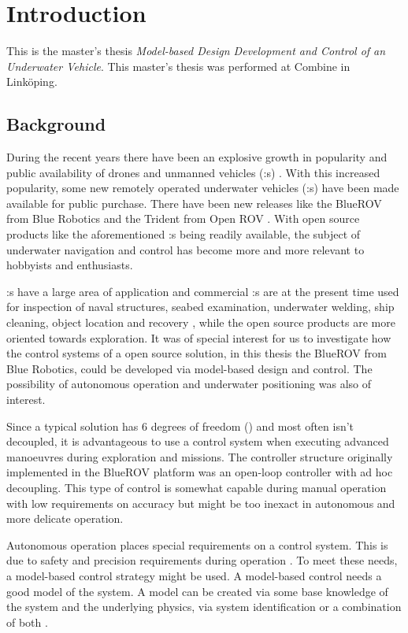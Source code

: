 \chapter{Introduction}\label{cha:intro}
This is the master's thesis \textit{Model-based Design Development and Control of an Underwater Vehicle}.
This master's thesis was performed at Combine in Linköping.

\section{Background}
During the recent years there have been an explosive growth in popularity and public availability of drones and unmanned vehicles (\abbrUV:s) \citep{popmechanics}. With this increased popularity, some new remotely operated underwater vehicles (\abbrROV:s) have been made available for public purchase. There have been new releases like the BlueROV from Blue Robotics \citep{bluerobotics} and the Trident from Open ROV \citep{openrov}. With open source products like the aforementioned \abbrROV:s being readily available, the subject of underwater navigation and control has become more and more relevant to hobbyists and enthusiasts.

\abbrROV:s have a large area of application and commercial \abbrROV:s are at the present time used for inspection of naval structures, seabed examination, underwater welding, ship cleaning, object location and recovery \citep{saab}, while the open source products are more oriented towards exploration. It was of special interest for us to investigate how the control systems of a open source \abbrROV solution, in this thesis the BlueROV from Blue Robotics, could be developed via model-based design and control. The possibility of autonomous operation and underwater positioning was also of interest.

Since a typical \abbrROV solution has 6 degrees of freedom (\abbrDOF) and most often isn't decoupled, it is advantageous to use a control system when executing advanced manoeuvres during exploration and missions. The controller structure originally implemented in the BlueROV platform was an open-loop controller with ad hoc decoupling. This type of control is somewhat capable during manual operation with low requirements on accuracy but might be too inexact in autonomous and more delicate operation. 

Autonomous operation places special requirements on a control system. This is due to safety and precision requirements during operation \citep[p. 416]{safety}. To meet these needs, a model-based control strategy might be used. A model-based control needs a good model of the system. A model can be created via some base knowledge of the system and the underlying physics, via system identification or a combination of both \citet{modellbygge}. 

